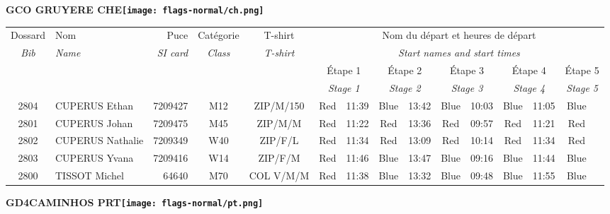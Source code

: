 \documentclass{report}
\begin{document}
\newpage
  \Huge \centering \bfseries GCO GRUYERE  CHE\normalfont \footnotesize \sffamily \hfill \texttt{[image: flags-normal/ch.png]} \newline 
  \begin{longtable}{|c|l|r|c|c|*{5}{cc|}}
    Dossard & Nom  & Puce    & Catégorie & T-shirt & \multicolumn{10}{c|}{Nom du départ et heures de départ} \\
    \itshape Bib     & \itshape Name & \itshape SI card & \itshape Class  & \itshape  T-shirt  & \multicolumn{10}{c|}{\itshape Start names and start times} \\
    \hline
    & & & & & \multicolumn{2}{c|}{Étape 1} & \multicolumn{2}{c|}{Étape 2} & \multicolumn{2}{c|}{Étape 3} & \multicolumn{2}{c|}{Étape 4} & \multicolumn{2}{c|}{Étape 5} \\
    & & & & & \multicolumn{2}{c|}{\itshape Stage 1} & \multicolumn{2}{c|}{\itshape Stage 2} & \multicolumn{2}{c|}{\itshape Stage 3} & \multicolumn{2}{c|}{\itshape Stage 4} & \multicolumn{2}{c|}{\itshape Stage 5} \\
    \hline
    2804 & CUPERUS Ethan & 7209427 & M12 & ZIP/M/150 & Red & 11:39 & Blue & 13:42 & Blue & 10:03 & Blue & 11:05 & Blue &  \\
    2801 & CUPERUS Johan & 7209475 & M45 & ZIP/M/M & Red & 11:22 & Red & 13:36 & Red & 09:57 & Red & 11:21 & Red &  \\
    2802 & CUPERUS Nathalie & 7209349 & W40 & ZIP/F/L & Red & 11:34 & Red & 13:09 & Red & 10:14 & Red & 11:34 & Red &  \\
    2803 & CUPERUS Yvana & 7209416 & W14 & ZIP/F/M & Red & 11:46 & Blue & 13:47 & Blue & 09:16 & Blue & 11:44 & Blue &  \\
    2800 & TISSOT Michel & 64640 & M70 & COL V/M/M & Red & 11:38 & Blue & 13:32 & Blue & 09:48 & Blue & 11:55 & Blue &  \\
  \end{longtable}
\newpage
  \Huge \centering \bfseries GD4CAMINHOS  PRT\normalfont \footnotesize \sffamily \hfill \texttt{[image: flags-normal/pt.png]} \newline 
\end{document}
